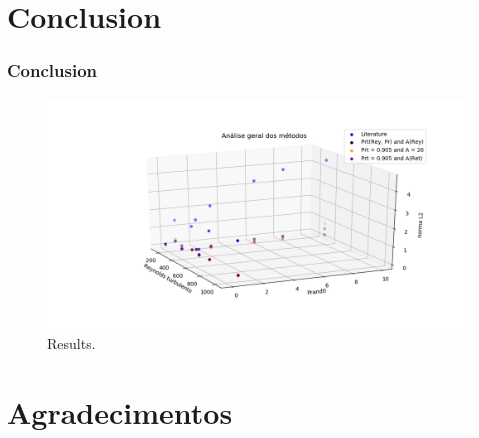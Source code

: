 \documentclass[xcolor=dvipsnames,8pt,aspectratio=34]{beamer}
\begin{document}
	
	
	
	
	\section{Conclusion}
	
	
	
	
	
	
	
		\begin{frame}
		\frametitle{Conclusion}
		\begin{center}
		\begin{figure}
			\centering
			\includegraphics[angle=0, scale=0.42]{finais}
			\caption{Results.}
		\end{figure}
		\end{center}
		\end{frame}
			
		
		
		

	
	\section{Agradecimentos}
		
		
		
		
		
\end{document}

